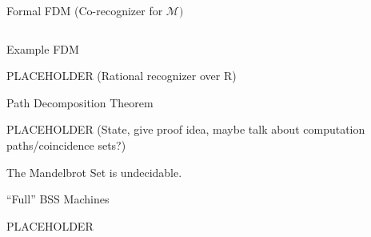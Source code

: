 \documentclass[c]{beamer}
\begin{document}

\begin{frame}{Formal FDM (Co-recognizer for $\mathcal{M})$}
  
  \begin{columns}
    \begin{center}
      \scaletopagewidth[.9]{\mandlegend{}}
    \end{center}
    
    \begin{center}
      \scaletopagewidth[.9]{\mandelrecfull{}}
    \end{center}
  \end{columns}

\end{frame}

\begin{frame}{Example FDM}
  
  PLACEHOLDER (Rational recognizer over R)
 
\end{frame}

\begin{frame}{Path Decomposition Theorem}

  PLACEHOLDER (State, give proof idea, maybe talk about computation
  paths/coincidence sets?)
  
\end{frame}

\begin{frame}
  \begin{corollary}
    The Mandelbrot Set is undecidable.
  \end{corollary}
\end{frame}

\begin{frame}{``Full'' BSS Machines}

  PLACEHOLDER

\end{frame}
\end{document}
